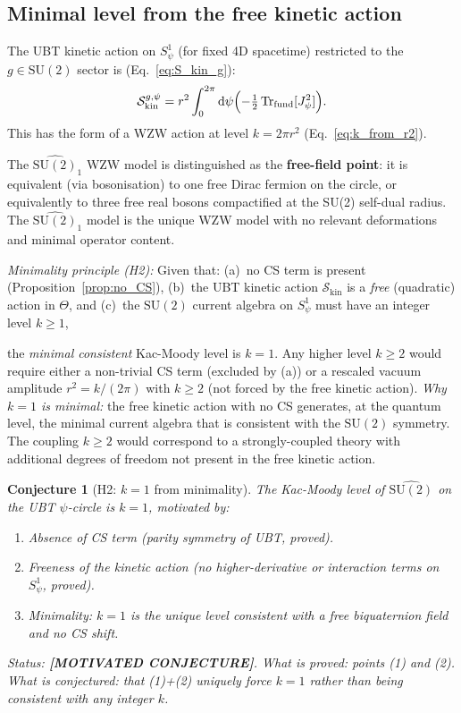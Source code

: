 \documentclass[11pt,a4paper]{article}
\newtheorem{conjecture}{Conjecture}
\theoremstyle{definition}
\theoremstyle{remark}
\begin{document}
\subsection{Minimal level from the free kinetic action}

The UBT kinetic action on $S^1_\psi$ (for fixed 4D spacetime)
restricted to the $g \in \mathrm{SU}(2)$ sector is
(Eq.~\eqref{eq:S_kin_g}):
\begin{equation}
  \mathcal{S}_{\mathrm{kin}}^{g,\psi}
  = r^2 \int_0^{2\pi} \mathrm{d}\psi
    \Bigl(-\tfrac{1}{2}\,\mathrm{Tr}_{\mathrm{fund}}[J_\psi^2]\Bigr).
  \label{eq:S_kin_g_H2}
\end{equation}
This has the form of a WZW action at level $k = 2\pi r^2$
(Eq.~\eqref{eq:k_from_r2}).

The $\widehat{\mathrm{SU}(2)}_1$ WZW model is distinguished as the
\textbf{free-field point}: it is equivalent (via bosonisation) to
one free Dirac fermion on the circle, or equivalently to three free
real bosons compactified at the SU(2) self-dual radius.
The $\widehat{\mathrm{SU}(2)}_1$ model is the unique WZW model with
no relevant deformations and minimal operator content.

\noindent\textit{Minimality principle (H2):}
Given that:
(a)~no CS term is present (Proposition~\ref{prop:no_CS}),
(b)~the UBT kinetic action $\mathcal{S}_{\mathrm{kin}}$ is
    a \emph{free} (quadratic) action in $\Theta$, and
(c)~the $\mathrm{SU}(2)$ current algebra on $S^1_\psi$ must have
    an integer level $k \geq 1$,

the \emph{minimal consistent} Kac-Moody level is $k = 1$.
Any higher level $k \geq 2$ would require either a non-trivial CS
term (excluded by (a)) or a rescaled vacuum amplitude $r^2 = k/(2\pi)$
with $k \geq 2$ (not forced by the free kinetic action).
\textit{Why $k=1$ is minimal:} the free kinetic action with no CS
generates, at the quantum level, the minimal current algebra that is
consistent with the $\mathrm{SU}(2)$ symmetry.
The coupling $k \geq 2$ would correspond to a strongly-coupled theory
with additional degrees of freedom not present in the free kinetic action.

\begin{conjecture}[H2: $k = 1$ from minimality]
  \label{conj:k1_H2}
  The Kac-Moody level of $\widehat{\mathrm{SU}(2)}$ on the UBT
  $\psi$-circle is $k = 1$, motivated by:
  \begin{enumerate}
    \item Absence of CS term (parity symmetry of UBT, proved).
    \item Freeness of the kinetic action (no higher-derivative or
      interaction terms on $S^1_\psi$, proved).
    \item Minimality: $k = 1$ is the unique level consistent with a
      free biquaternion field and no CS shift.
  \end{enumerate}
  Status: \textbf{[MOTIVATED CONJECTURE]}.
  What is proved: points (1) and (2).
  What is conjectured: that (1)+(2) uniquely force $k = 1$ rather
  than being consistent with \emph{any} integer $k$.
\end{conjecture}
\end{document}
